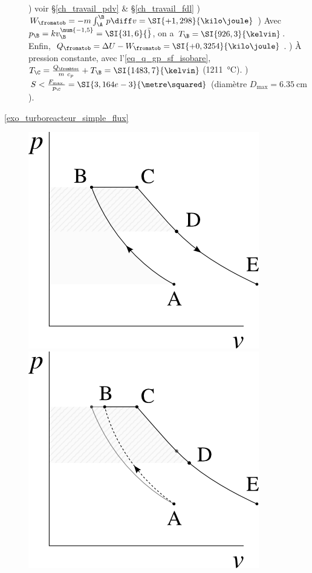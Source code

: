 \begin{description}
						) voir \S\ref{ch_travail_pdv} \& \S\ref{ch_travail_fdl}
					 	) $W_{\fromatob} = - m \int_\A^\B p \diff v = \SI{+1,298}{\kilo\joule}$ 	
						) Avec $p_\B = k v_\B^{\num{-1,5}} = \SI{31,6}{\bar}$, on a $T_\B = \SI{926,3}{\kelvin}$. Enfin, $Q_{\fromatob} = \Delta U - W_{\fromatob} = \SI{+0,3254}{\kilo\joule}$.
						) À pression constante, avec l’\cref{eq_q_gp_sf_isobare},  $T_\C = \frac{Q_\frombtoc}{m \ c_p} + T_\B = \SI{1483,7}{\kelvin}$ (\SI{1211}{\degreeCelsius}).
						) $S < \frac{F_\text{max.}}{p_\C} = \SI{3,164e-3}{\metre\squared}$ (diamètre $D_\text{max} = \SI{6,35}{\centi\metre}$).
	\item [\ref{exo_turboreacteur_simple_flux}]
						\includegraphics[width=\solutiondiagramwidth]{images/exo_sol_pv_turbojet_1.png}
						\includegraphics[width=\solutiondiagramwidth]{images/exo_sol_pv_turbojet_2.png}

\end{description}
